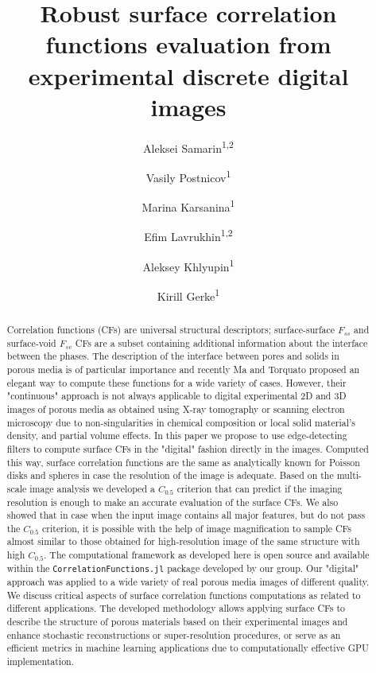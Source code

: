 \documentclass[reprint,amsmath,amssymb,aps,pre,showkeys,showpacs]{revtex4-1}
\newcommand{\code}[1]{\colorbox{light-gray}{\texttt{#1}}}
\begin{document}

\author{Aleksei Samarin\textsuperscript{1,2}}
\author{Vasily Postnicov\textsuperscript{1}}
\author{Marina Karsanina\textsuperscript{1}}
\author{Efim Lavrukhin\textsuperscript{1,2}}
\author{Aleksey Khlyupin\textsuperscript{1}}
\author{Kirill Gerke\textsuperscript{1}}


\title{Robust surface correlation functions evaluation from experimental
  discrete digital images}

\begin{abstract}
  Correlation functions (CFs) are universal structural descriptors;
  surface-surface $F_{ss}$ and surface-void $F_{sv}$ CFs are a subset containing
  additional information about the interface between the phases. The description
  of the interface between pores and solids in porous media is of particular
  importance and recently Ma and Torquato \cite{ma2018SS} proposed an elegant
  way to compute these functions for a wide variety of cases. However, their
  "continuous" approach is not always applicable to digital experimental 2D and
  3D images of porous media as obtained using X-ray tomography or scanning
  electron microscopy due to non-singularities in chemical composition or local
  solid material's density, and partial volume effects. In this paper we propose
  to use edge-detecting filters to compute surface CFs in the "digital" fashion
  directly in the images. Computed this way, surface correlation functions are
  the same as analytically known for Poisson disks and spheres in case the
  resolution of the image is adequate. Based on the multi-scale image analysis
  we developed a $C_{0.5}$ criterion that can predict if the imaging resolution
  is enough to make an accurate evaluation of the surface CFs. We also showed
  that in case when the input image contains all major features, but do not pass
  the $C_{0.5}$ criterion, it is possible with the help of image magnification
  to sample CFs almost similar to those obtained for high-resolution image of
  the same structure with high $C_{0.5}$. The computational framework as
  developed here is open source and available within the
  \code{CorrelationFunctions.jl} package developed by our group. Our "digital"
  approach was applied to a wide variety of real porous media images of
  different quality. We discuss critical aspects of surface correlation
  functions computations as related to different applications. The developed
  methodology allows applying surface CFs to describe the structure of porous
  materials based on their experimental images and enhance stochastic
  reconstructions or super-resolution procedures, or serve as an efficient
  metrics in machine learning applications due to computationally effective GPU
  implementation.
\end{abstract}
\end{document}
